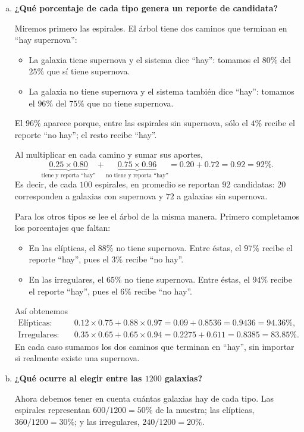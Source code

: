 \documentclass[a4paper]{article}
\begin{document}
\begin{enumerate}[a)]
\item \textbf{¿Qué porcentaje de cada tipo genera un reporte de candidata?}

Miremos primero las espirales. El árbol tiene dos caminos que terminan en ``hay supernova'':
\begin{itemize}
    \item La galaxia tiene supernova y el sistema dice ``hay'': tomamos el $80\%$ del $25\%$ que sí tiene supernova.
    \item La galaxia no tiene supernova y el sistema también dice ``hay'': tomamos el $96\%$ del $75\%$ que no tiene supernova.
\end{itemize}
El $96\%$ aparece porque, entre las espirales sin supernova, sólo el $4\%$ recibe el reporte ``no hay''; el resto recibe ``hay''.

Al multiplicar en cada camino y sumar sus aportes,
$$
\underbrace{0.25\times0.80}_{\text{tiene y reporta ``hay''}}
+\underbrace{0.75\times0.96}_{\text{no tiene y reporta ``hay''}}
=0.20+0.72=\boxed{0.92=92\%}.
$$
Es decir, de cada $100$ espirales, en promedio se reportan $92$ candidatas: $20$ corresponden a galaxias con supernova y $72$ a galaxias sin supernova.

Para los otros tipos se lee el árbol de la misma manera. Primero completamos los porcentajes que faltan:
\begin{itemize}
    \item En las elípticas, el $88\%$ no tiene supernova. Entre éstas, el $97\%$ recibe el reporte ``hay'', pues el $3\%$ recibe ``no hay''.
    \item En las irregulares, el $65\%$ no tiene supernova. Entre éstas, el $94\%$ recibe el reporte ``hay'', pues el $6\%$ recibe ``no hay''.
\end{itemize}
Así obtenemos
\begin{align*}
\text{Elípticas:}\quad
&0.12\times0.75+0.88\times0.97
=0.09+0.8536=\boxed{0.9436=94.36\%},\\[2mm]
\text{Irregulares:}\quad
&0.35\times0.65+0.65\times0.94
=0.2275+0.611=\boxed{0.8385=83.85\%}.
\end{align*}
En cada caso sumamos los dos caminos que terminan en ``hay'', sin importar si realmente existe una supernova.

\item \textbf{¿Qué ocurre al elegir entre las $1200$ galaxias?}

Ahora debemos tener en cuenta cuántas galaxias hay de cada tipo. Las espirales representan $600/1200=50\%$ de la muestra; las elípticas, $360/1200=30\%$; y las irregulares, $240/1200=20\%$.


\end{enumerate}
\end{document}

